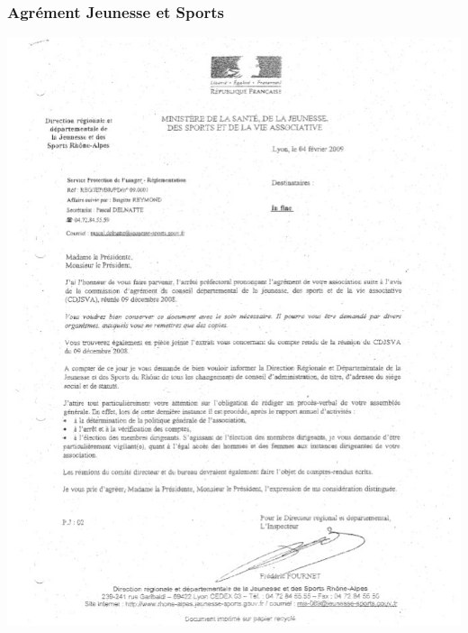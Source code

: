 \documentclass[hidelinks, paper=a4, fontsize=13pt]{report}
\begin{document}
\subsubsection{Agrément Jeunesse et Sports}



\begin{center}
\includegraphics[scale=0.85]{Annexes/Documents/AgrementJeunesseEtSports}
\end{center}
\end{document}
